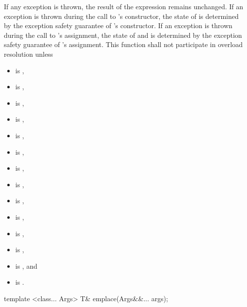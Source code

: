 \begin{itemdescr}
\pnum
\remarks
If any exception is thrown,
the result of the expression  remains unchanged.
If an exception is thrown during the call to 's constructor,
the state of  is determined by
the exception safety guarantee of 's constructor.
If an exception is thrown during the call to 's assignment,
the state of  and  is determined by
the exception safety guarantee of 's assignment.
This function shall not participate in overload resolution unless
\begin{itemize}
\item {} is ,
\item {} is ,
\item {} is ,
\item {} is ,
\item {} is ,
\item {} is ,
\item {} is ,
\item {} is ,
\item {} is ,
\item {} is ,
\item {} is ,
\item {} is ,
\item {} is , and
\item {} is .
\end{itemize}
\end{itemdescr}

%
\begin{itemdecl}
template <class... Args> T& emplace(Args&&... args);
\end{itemdecl}

